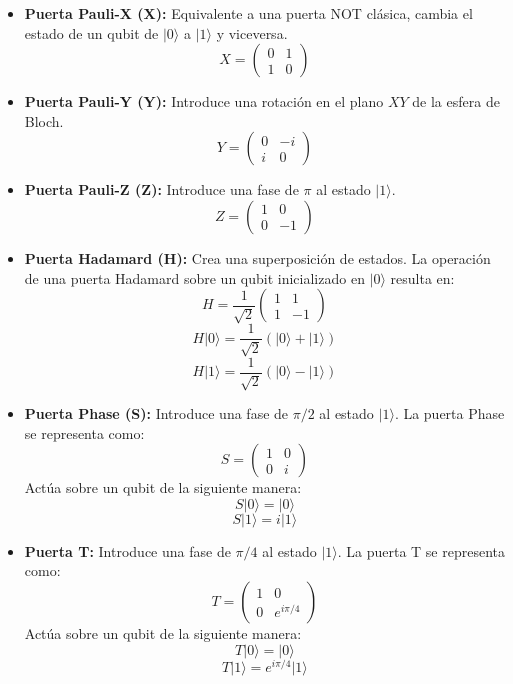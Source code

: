 \documentclass[11pt,a4paper,spanish]{book}
\begin{document}
\begin{itemize}
	\item \textbf{Puerta Pauli-X (X):} Equivalente a una puerta NOT clásica, cambia el estado de un qubit de \(\lvert 0 \rangle\) a \(\lvert 1 \rangle\) y viceversa.
	\[
	X = \begin{pmatrix}
		0 & 1 \\
		1 & 0
	\end{pmatrix}
	\]
	
	\item \textbf{Puerta Pauli-Y (Y):} Introduce una rotación en el plano \(XY\) de la esfera de Bloch.
	\[
	Y = \begin{pmatrix}
		0 & -i \\
		i & 0
	\end{pmatrix}
	\]
	
	\item \textbf{Puerta Pauli-Z (Z):} Introduce una fase de \(\pi\) al estado \(\lvert 1 \rangle\).
	\[
	Z = \begin{pmatrix}
		1 & 0 \\
		0 & -1
	\end{pmatrix}
	\]
	
	\item \textbf{Puerta Hadamard (H):} Crea una superposición de estados. La operación de una puerta Hadamard sobre un qubit inicializado en \(\lvert 0 \rangle\) resulta en:
	\[
	H = \frac{1}{\sqrt{2}} \begin{pmatrix}
		1 & 1 \\
		1 & -1
	\end{pmatrix}
	\]
	\[ H \lvert 0 \rangle = \frac{1}{\sqrt{2}} (\lvert 0 \rangle + \lvert 1 \rangle) \]
	\[ H \lvert 1 \rangle = \frac{1}{\sqrt{2}} (\lvert 0 \rangle - \lvert 1 \rangle) \]
	
	\item \textbf{Puerta Phase (S):} Introduce una fase de \(\pi/2\) al estado \(\lvert 1 \rangle\). La puerta Phase se representa como:
	\[
	S = \begin{pmatrix}
		1 & 0 \\
		0 & i
	\end{pmatrix}
	\]
	Actúa sobre un qubit de la siguiente manera:
	\[ S \lvert 0 \rangle = \lvert 0 \rangle \]
	\[ S \lvert 1 \rangle = i \lvert 1 \rangle \]
	
	\item \textbf{Puerta T:} Introduce una fase de \(\pi/4\) al estado \(\lvert 1 \rangle\). La puerta T se representa como:
	\[
	T = \begin{pmatrix}
		1 & 0 \\
		0 & e^{i\pi/4}
	\end{pmatrix}
	\]
	Actúa sobre un qubit de la siguiente manera:
	\[ T \lvert 0 \rangle = \lvert 0 \rangle \]
	\[ T \lvert 1 \rangle = e^{i\pi/4} \lvert 1 \rangle \]
	

\end{itemize}
\end{document}
